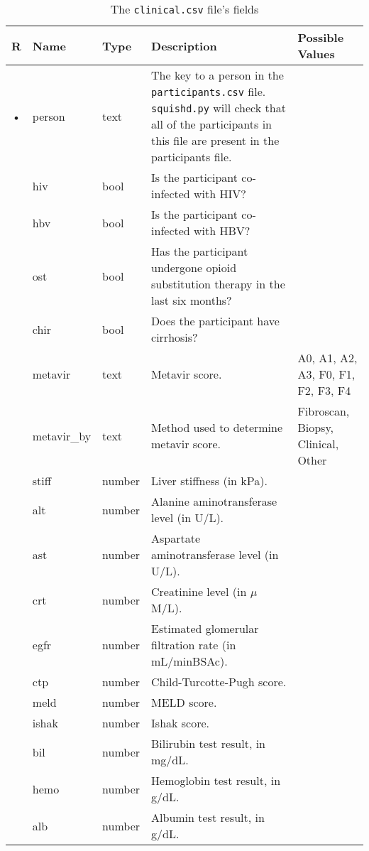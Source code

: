 \documentclass{article}
\begin{document}
\begin{table}[h!]
  \centering
  \caption{The \texttt{clinical.csv} file's fields}
  \label{tbl:clinical.csv}
  \begin{tabular}{cllp{6cm}p{4cm}}
    R & Name        & Type      & Description & Possible Values\\ \hline
  • & person      & text    & The key to a person in the \texttt{participants.csv}
    file. \texttt{squishd.py} will check that all of the participants in this file
    are present in the participants file. \\
    & hiv           & bool      & Is the participant co-infected with HIV? & \\
    & hbv           & bool      & Is the participant co-infected with HBV? & \\
    & ost           & bool      & Has the participant undergone opioid substitution therapy in the last six months? &  \\
    & chir          & bool      & Does the participant have cirrhosis? & \\
    & metavir       & text      & Metavir score. & A0, A1, A2, A3, F0, F1, F2, F3, F4 \\
    & metavir\_by   & text      & Method used to determine metavir score. & Fibroscan, Biopsy, Clinical, Other \\
    & stiff         & number    & Liver stiffness (in kPa). & \\
    & alt           & number    & Alanine aminotransferase level (in U/L). & \\
    & ast           & number    & Aspartate aminotransferase level (in U/L). & \\
    & crt           & number    & Creatinine level (in $\mu$M/L). & \\
    & egfr          & number    & Estimated glomerular filtration rate (in mL/minBSAc). & \\
    & ctp           & number    & Child-Turcotte-Pugh score. & \\
    & meld          & number    & MELD score. & \\
    & ishak         & number    & Ishak score. & \\
    & bil           & number    & Bilirubin test result, in mg/dL. & \\
    & hemo          & number    & Hemoglobin test result, in g/dL. & \\
    & alb           & number    & Albumin test result, in g/dL. & \\

\end{tabular}
\end{table}
\end{document}
